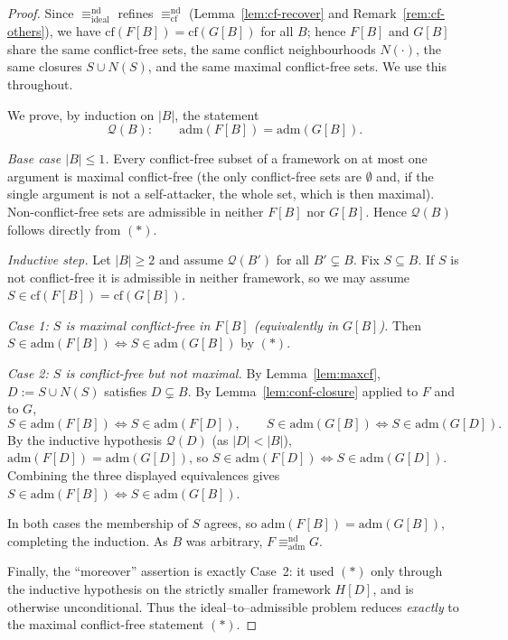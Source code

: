 \documentclass{amsart}
\theoremstyle{remark}
\begin{document}
\begin{proof}
Since $\equiv^{\mathrm{nd}}_{\mathrm{ideal}}$ refines
$\equiv^{\mathrm{nd}}_{\mathrm{cf}}$ (Lemma~\ref{lem:cf-recover} and
Remark~\ref{rem:cf-others}), we have $\mathrm{cf}(F[B])=\mathrm{cf}(G[B])$ for all
$B$; hence $F[B]$ and $G[B]$ share the same conflict-free sets, the same
conflict neighbourhoods $N(\cdot)$, the same closures $S\cup N(S)$, and the same
maximal conflict-free sets.  We use this throughout.

We prove, by induction on $|B|$, the statement
\[
\mathcal Q(B):\qquad \mathrm{adm}(F[B])=\mathrm{adm}(G[B]).
\]

\emph{Base case $|B|\le 1$.}  Every conflict-free subset of a framework on at
most one argument is maximal conflict-free (the only conflict-free sets are
$\emptyset$ and, if the single argument is not a self-attacker, the whole set,
which is then maximal).  Non-conflict-free sets are admissible in neither $F[B]$
nor $G[B]$.  Hence $\mathcal Q(B)$ follows directly from $(\ast)$.

\emph{Inductive step.}  Let $|B|\ge 2$ and assume $\mathcal Q(B')$ for all
$B'\subsetneq B$.  Fix $S\subseteq B$.  If $S$ is not conflict-free it is
admissible in neither framework, so we may assume $S\in\mathrm{cf}(F[B])=
\mathrm{cf}(G[B])$.

\emph{Case 1: $S$ is maximal conflict-free in $F[B]$ (equivalently in $G[B]$).}
Then $S\in\mathrm{adm}(F[B])\iff S\in\mathrm{adm}(G[B])$ by $(\ast)$.

\emph{Case 2: $S$ is conflict-free but not maximal.}  By Lemma~\ref{lem:maxcf},
$D:=S\cup N(S)$ satisfies $D\subsetneq B$.  By
Lemma~\ref{lem:conf-closure} applied to $F$ and to $G$,
\[
S\in\mathrm{adm}(F[B])\iff S\in\mathrm{adm}(F[D]),\qquad
S\in\mathrm{adm}(G[B])\iff S\in\mathrm{adm}(G[D]).
\]
By the inductive hypothesis $\mathcal Q(D)$ (as $|D|<|B|$),
$\mathrm{adm}(F[D])=\mathrm{adm}(G[D])$, so $S\in\mathrm{adm}(F[D])\iff
S\in\mathrm{adm}(G[D])$.  Combining the three displayed equivalences gives
$S\in\mathrm{adm}(F[B])\iff S\in\mathrm{adm}(G[B])$.

In both cases the membership of $S$ agrees, so $\mathrm{adm}(F[B])=
\mathrm{adm}(G[B])$, completing the induction.  As $B$ was arbitrary,
$F\equiv^{\mathrm{nd}}_{\mathrm{adm}}G$.

Finally, the ``moreover'' assertion is exactly Case~2: it used $(\ast)$ only
through the inductive hypothesis on the strictly smaller framework $H[D]$, and is
otherwise unconditional.  Thus the ideal--to--admissible problem reduces
\emph{exactly} to the maximal conflict-free statement $(\ast)$.
\end{proof}
\end{document}
